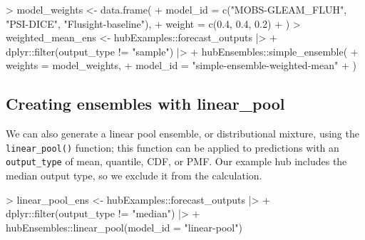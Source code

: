 \documentclass[
  letterpaper,
  DIV=11,
  numbers=noendperiod]{scrartcl}
\newenvironment{Shaded}{\begin{snugshade}}{\end{snugshade}}
\newcommand{\AttributeTok}[1]{\textcolor[rgb]{0.40,0.45,0.13}{#1}}
\newcommand{\FloatTok}[1]{\textcolor[rgb]{0.68,0.00,0.00}{#1}}
\newcommand{\FunctionTok}[1]{\textcolor[rgb]{0.28,0.35,0.67}{#1}}
\newcommand{\NormalTok}[1]{\textcolor[rgb]{0.00,0.23,0.31}{#1}}
\newcommand{\OtherTok}[1]{\textcolor[rgb]{0.00,0.23,0.31}{#1}}
\newcommand{\SpecialCharTok}[1]{\textcolor[rgb]{0.37,0.37,0.37}{#1}}
\newcommand{\StringTok}[1]{\textcolor[rgb]{0.13,0.47,0.30}{#1}}
\begin{document}
\begin{Shaded}
\begin{Highlighting}[]
\SpecialCharTok{\textgreater{}}\NormalTok{ model\_weights }\OtherTok{\textless{}{-}} \FunctionTok{data.frame}\NormalTok{(}
\SpecialCharTok{+}   \AttributeTok{model\_id =} \FunctionTok{c}\NormalTok{(}\StringTok{"MOBS{-}GLEAM\_FLUH"}\NormalTok{, }\StringTok{"PSI{-}DICE"}\NormalTok{, }\StringTok{"Flusight{-}baseline"}\NormalTok{),}
\SpecialCharTok{+}   \AttributeTok{weight =} \FunctionTok{c}\NormalTok{(}\FloatTok{0.4}\NormalTok{, }\FloatTok{0.4}\NormalTok{, }\FloatTok{0.2}\NormalTok{)}
\SpecialCharTok{+}\NormalTok{ )}
\SpecialCharTok{\textgreater{}}\NormalTok{ weighted\_mean\_ens }\OtherTok{\textless{}{-}}\NormalTok{ hubExamples}\SpecialCharTok{::}\NormalTok{forecast\_outputs }\SpecialCharTok{|\textgreater{}}
\SpecialCharTok{+}\NormalTok{   dplyr}\SpecialCharTok{::}\FunctionTok{filter}\NormalTok{(output\_type }\SpecialCharTok{!=} \StringTok{"sample"}\NormalTok{) }\SpecialCharTok{|\textgreater{}}
\SpecialCharTok{+}\NormalTok{   hubEnsembles}\SpecialCharTok{::}\FunctionTok{simple\_ensemble}\NormalTok{(}
\SpecialCharTok{+}     \AttributeTok{weights =}\NormalTok{ model\_weights,}
\SpecialCharTok{+}     \AttributeTok{model\_id =} \StringTok{"simple{-}ensemble{-}weighted{-}mean"}
\SpecialCharTok{+}\NormalTok{   )}
\end{Highlighting}
\end{Shaded}

\subsection{Creating ensembles with
linear\_pool}\label{creating-ensembles-with-linear_pool}

We can also generate a linear pool ensemble, or distributional mixture,
using the \texttt{linear\_pool()} function; this function can be applied
to predictions with an \texttt{output\_type} of mean, quantile, CDF, or
PMF. Our example hub includes the median output type, so we exclude it
from the calculation.

\begin{Shaded}
\begin{Highlighting}[]
\SpecialCharTok{\textgreater{}}\NormalTok{ linear\_pool\_ens }\OtherTok{\textless{}{-}}\NormalTok{ hubExamples}\SpecialCharTok{::}\NormalTok{forecast\_outputs }\SpecialCharTok{|\textgreater{}}
\SpecialCharTok{+}\NormalTok{   dplyr}\SpecialCharTok{::}\FunctionTok{filter}\NormalTok{(output\_type }\SpecialCharTok{!=} \StringTok{"median"}\NormalTok{) }\SpecialCharTok{|\textgreater{}}
\SpecialCharTok{+}\NormalTok{   hubEnsembles}\SpecialCharTok{::}\FunctionTok{linear\_pool}\NormalTok{(}\AttributeTok{model\_id =} \StringTok{"linear{-}pool"}\NormalTok{)}
\end{Highlighting}
\end{Shaded}
\end{document}
